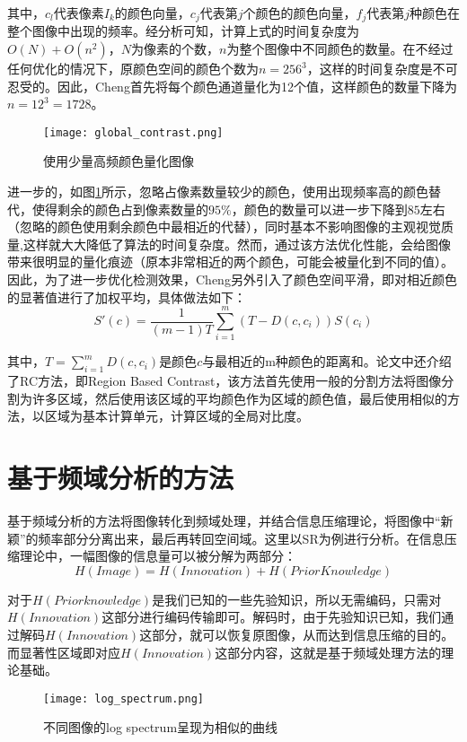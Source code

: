 其中，$c_l$代表像素$I_k$的颜色向量，$c_j$代表第$j$个颜色的颜色向量，$f_j$代表第$j$种颜色在整个图像中出现的频率。经分析可知，计算上式的时间复杂度为$O(N)+O(n^2)$，$N$为像素的个数，$n$为整个图像中不同颜色的数量。在不经过任何优化的情况下，原颜色空间的颜色个数为$n=256^3$，这样的时间复杂度是不可忍受的。因此，Cheng首先将每个颜色通道量化为12个值，这样颜色的数量下降为$n=12^3=1728$。
\begin{figure}
\centering
\texttt{[image: global\_contrast.png]}
\caption{使用少量高频颜色量化图像}\label{fig:global_contrast}
\end{figure}
进一步的，如图\ref{fig:global_contrast}所示，忽略占像素数量较少的颜色，使用出现频率高的颜色替代，使得剩余的颜色占到像素数量的$95\%$，颜色的数量可以进一步下降到$85$左右（忽略的颜色使用剩余颜色中最相近的代替），同时基本不影响图像的主观视觉质量\cite{cheng2011global},这样就大大降低了算法的时间复杂度。然而，通过该方法优化性能，会给图像带来很明显的量化痕迹（原本非常相近的两个颜色，可能会被量化到不同的值）。因此，为了进一步优化检测效果，Cheng另外引入了颜色空间平滑，即对相近颜色的显著值进行了加权平均，具体做法如下：
\begin{equation}
S'(c) = \frac{1}{(m-1)T}\sum_{i=1}^{m}(T-D(c,c_i))S(c_i)
\end{equation}

其中，$T=\sum_{i=1}^m D(c,c_i)$是颜色$c$与最相近的m种颜色的距离和。论文中还介绍了RC方法，即Region Based Contrast，该方法首先使用一般的分割方法将图像分割为许多区域，然后使用该区域的平均颜色作为区域的颜色值，最后使用相似的方法，以区域为基本计算单元，计算区域的全局对比度。

\section{基于频域分析的方法}
基于频域分析的方法将图像转化到频域处理，并结合信息压缩理论，将图像中“新颖”的频率部分分离出来，最后再转回空间域。这里以SR\cite{hou2007saliency}为例进行分析。在信息压缩理论中，一幅图像的信息量可以被分解为两部分：
\begin{equation}
H(Image)=H(Innovation)+H(Prior Knowledge)
\end{equation}

对于$H(Prior knowledge)$是我们已知的一些先验知识，所以无需编码，只需对$H(Innovation)$这部分进行编码传输即可。解码时，由于先验知识已知，我们通过解码$H(Innovation)$这部分，就可以恢复原图像，从而达到信息压缩的目的。而显著性区域即对应$H(Innovation)$这部分内容，这就是基于频域处理方法的理论基础。

\begin{figure}[h]
\centering
\texttt{[image: log\_spectrum.png]}
\caption{不同图像的log spectrum呈现为相似的曲线}\label{fig:log_spectrum}
\end{figure}


